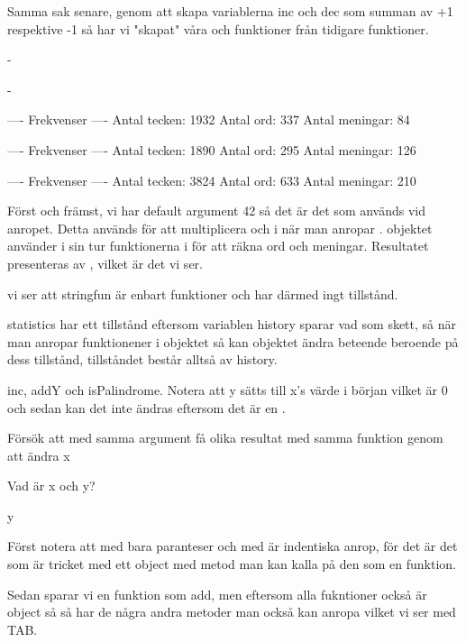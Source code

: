 Samma sak senare, genom att skapa variablerna inc och dec som summan av +1 respektive -1 så har vi "skapat" våra  och  funktioner från tidigare funktioner.

\Task

\Subtask -

\Subtask -

\Subtask
\begin{REPLnonum}

---- Frekvenser ----
Antal tecken: 1932
Antal ord: 337
Antal meningar: 84

---- Frekvenser ----
Antal tecken: 1890
Antal ord: 295
Antal meningar: 126

---- Frekvenser ----
Antal tecken: 3824
Antal ord: 633
Antal meningar: 210

\end{REPLnonum}

Först och främst, vi har default argument 42 så det är det som används vid anropet. Detta används för att multiplicera  och  i  när man anropar .  objektet använder i sin tur funktionerna i  för att räkna ord och meningar. Resultatet presenteras av , vilket är det vi ser.

\Subtask vi ser att stringfun är enbart funktioner och har därmed ingt tillstånd.

statistics har ett tillstånd eftersom variablen history sparar vad som skett, så när man anropar funktionener i objektet så kan objektet ändra beteende beroende på dess tillstånd, tillståndet består alltså av history.

\Task

\Subtask inc, addY och isPalindrome. Notera att y sätts till x's värde i början vilket är 0 och sedan kan det inte ändras eftersom det är en .

\Subtask Försök att med samma argument få olika resultat med samma funktion genom att ändra x

\Subtask Vad är x och y?

\Subtask y

\Task

\Subtask
Först notera att  med bara paranteser och med  är indentiska anrop, för det är det som är tricket med ett object med  metod man kan kalla på den som en funktion.

Sedan sparar vi en funktion som add, men eftersom alla fukntioner också är object så så har de några andra metoder man också kan anropa vilket vi ser med TAB.

